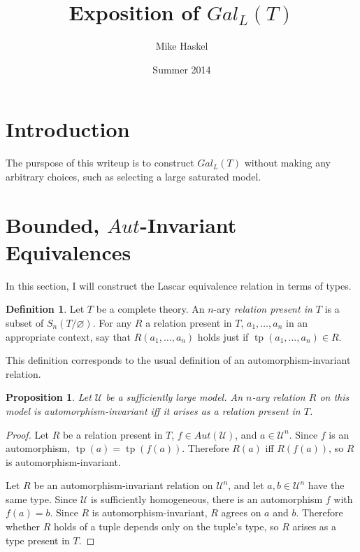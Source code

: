 \documentclass[letterpaper,twoside]{article}
\title{Exposition of \(Gal_L(T)\)}
\author{Mike Haskel}
\date{Summer 2014}
\newtheorem{proposition}[theorem]{Proposition}
\theoremstyle{definition}
\newtheorem{definition}[theorem]{Definition}
\theoremstyle{remark}
\newcommand{\defterm}[1]{\emph{#1}}
\renewcommand{\emptyset}{\varnothing}
\DeclareMathOperator{\tp}{tp}
\begin{document}
\maketitle

\section{Introduction}

The purspose of this writeup is to construct \(Gal_L(T)\) without
making any arbitrary choices, such as selecting a large saturated
model.

\section{Bounded, \(Aut\)-Invariant Equivalences}

In this section, I will construct the Lascar equivalence relation in
terms of types.

\begin{definition}
  Let \(T\) be a complete theory.  An \(n\)-ary \defterm{relation
    present in \(T\)} is a subset of \(S_n(T/\emptyset)\).  For any
  \(R\) a relation present in \(T\), \(a_1,\ldots,a_n\) in an
  appropriate context, say that \(R(a_1,\ldots,a_n)\) holds just if
  \(\tp(a_1,\ldots,a_n) \in R\).
\end{definition}

This definition corresponds to the usual definition of an
automorphism-invariant relation.

\begin{proposition}
  Let \(\mathcal{U}\) be a sufficiently large model.  An \(n\)-ary
  relation \(R\) on this model is automorphism-invariant iff it arises
  as a relation present in \(T\).
\end{proposition}
\begin{proof}
  Let \(R\) be a relation present in \(T\), \(f \in
  Aut(\mathcal{U})\), and \(a\in \mathcal{U}^n\).  Since \(f\) is an
  automorphism, \(\tp(a) = \tp(f(a))\).  Therefore \(R(a)\) iff
  \(R(f(a))\), so \(R\) is automorphism-invariant.

  Let \(R\) be an automorphism-invariant relation on
  \(\mathcal{U}^n\), and let \(a,b \in \mathcal{U}^n\) have the same
  type.  Since \(\mathcal{U}\) is sufficiently homogeneous, there is
  an automorphism \(f\) with \(f(a) = b\).  Since \(R\) is
  automorphism-invariant, \(R\) agrees on \(a\) and \(b\).  Therefore
  whether \(R\) holds of a tuple depends only on the tuple's type, so
  \(R\) arises as a type present in \(T\).
\end{proof}
\end{document}

